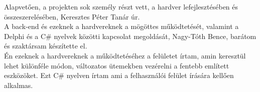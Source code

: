\documentclass[tocnopagenum]{thesis-ekf}
\theoremstyle{definition}
\theoremstyle{remark}
\begin{document}

	Alapvetően, a projekten sok személy részt vett, a hardver lefejlesztésében és 
	összeszerelésében, Keresztes Péter Tanár úr. \\
	A back-end és ezeknek a hardvereknek a mögöttes működtetését, valamint a Delphi és a C\# nyelvek közötti kapcsolat megoldását, Nagy-Tóth Bence, barátom és szaktársam készítette el.
	\\
	Én ezeknek a hardvereknek a működtetéséhez a felületet írtam, amin keresztül lehet különféle módon, változatos ütemekben vezérelni a fentebb említett eszközöket. Ezt C\# nyelven írtam ami a felhasználói felület írására kellően alkalmas.
	
	

\end{document}
